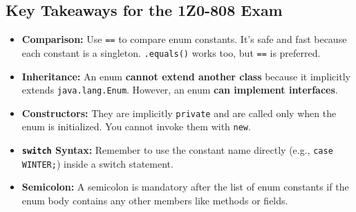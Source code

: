 \documentclass[12pt]{article}
\begin{document}
\begin{enumerate}[label=(\arabic*)]
\section{Key Takeaways for the 1Z0-808 Exam}
\begin{itemize}
    \item \textbf{Comparison:} Use \texttt{==} to compare enum constants. It's safe and fast because each constant is a singleton. \texttt{.equals()} works too, but \texttt{==} is preferred.
    \item \textbf{Inheritance:} An enum \textbf{cannot extend another class} because it implicitly extends \texttt{java.lang.Enum}. However, an enum \textbf{can implement interfaces}.
    \item \textbf{Constructors:} They are implicitly \texttt{private} and are called only when the enum is initialized. You cannot invoke them with \texttt{new}.
    \item \textbf{\texttt{switch} Syntax:} Remember to use the constant name directly (e.g., \texttt{case WINTER;}) inside a switch statement.
    \item \textbf{Semicolon:} A semicolon is mandatory after the list of enum constants if the enum body contains any other members like methods or fields.
\end{itemize}
\end{enumerate}
\end{document}
